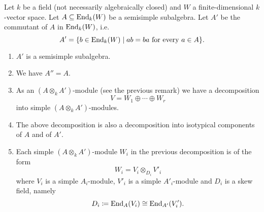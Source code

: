 \begin{thrm}
 Let $k$ be a field (not necessarily algebraically closed) and $W$ a finite-dimensional $k$-vector space. Let $A \subseteq \operatorname{End}_k(W)$ be a semisimple subalgebra. Let $A'$ be the commutant of $A$ in $\operatorname{End}_k(W)$, i.e.\
 \[
  A' = \{b \in \operatorname{End}_k(W) \mid ab = ba \text{ for every } a \in A\}.
 \]
 \begin{enumerate}[label=\emph{\alph*)},leftmargin=*]
  \item
   $A'$ is a semisimple subalgebra.
  \item
   We have $A'' = A$.
  \item
   As an $(A \otimes_k A')$-module (see the previous remark) we have a decomposition
   \[
    V = W_1 \oplus \dotsb \oplus W_r
   \]
   into simple $(A \otimes_k A')$-modules.
  \item
   The above decomposition is also a decomposition into isotypical components of $A$ and of $A'$.
  \item
   Each simple $(A \otimes_k A')$-module $W_i$ in the previous decomposition is of the form
   \[
    W_i = V_i \otimes_{D_i} V'_i
   \]
   where $V_i$ is a simple $A_i$-module, $V'_i$ is a simple $A'_i$-module and $D_i$ is a skew field, namely
   \[
    D_i \coloneqq \operatorname{End}_A(V_i) \cong \operatorname{End}_{A'}(V'_i).
   \]
 \end{enumerate}
\end{thrm}








































































